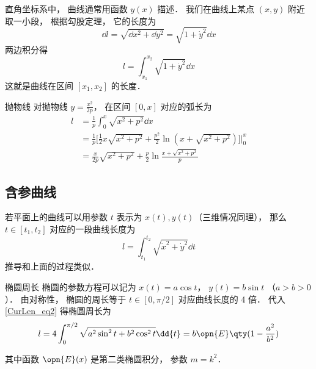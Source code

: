 

直角坐标系中， 曲线通常用函数 $y(x)$ 描述． 我们在曲线上某点 $(x, y)$ 附近取一小段， 根据勾股定理， 它的长度为
\begin{equation}
\dd{l} = \sqrt{\dd{x}^2 + \dd{y}^2} = \sqrt{1 + \dot y^2} \dd{x}
\end{equation}
两边积分得
\begin{equation}\label{CurLen_eq1}
l = \int_{x_1}^{x_2} \sqrt{1 + \dot y^2} \dd{x}
\end{equation}
这就是曲线在区间 $[x_1, x_2]$ 的长度．

\begin{example}{抛物线}
对抛物线 $y=\frac{x^2}{2p}$， 在区间 $[0,x]$ 对应的弧长为
\begin{equation}
\begin{aligned}
l& = \frac{1}{p}\int_{0}^{x}\sqrt{x^2+p^2}\dd{x}\\
&=\frac{1}{p}\bigg[\frac{1}{2}x\sqrt{x^2+p^2}+\frac{p^2}{2}\ln(x+\sqrt{x^2+p^2})\bigg]\Bigg\lvert_{0}^{x}\\
&=\frac{x}{2p}\sqrt{x^2+p^2}+\frac{p}{2}\ln\frac{x+\sqrt{x^2+p^2}}{p}
\end{aligned}
\end{equation}
\end{example}

\subsection{含参曲线}
若平面上的曲线可以用参数 $t$ 表示为 $x(t), y(t)$（三维情况同理）， 那么 $t \in [t_1, t_2]$ 对应的一段曲线长度为
\begin{equation}\label{CurLen_eq2}
l = \int_{t_1}^{t_2} \sqrt{\dot x^2 + \dot y^2} \dd{t}
\end{equation}
推导和上面的过程类似．

\begin{example}{椭圆周长}
椭圆的参数方程可以记为 $x(t) = a\cos t$， $y(t) = b\sin t$ （$a > b > 0$）． 由对称性， 椭圆的周长等于 $t \in [0, \pi/2]$ 对应曲线长度的 4 倍． 代入\autoref{CurLen_eq2} 得椭圆周长为
\begin{equation}
l = 4\int_0^{\pi/2} \sqrt{a^2\sin^2 t + b^2 \cos^2 t} \dd{t} = b \opn{E}\qty(1 - \frac{a^2}{b^2})
\end{equation}
\end{example}
其中函数 $\opn{E}(x)$ 是第二类椭圆积分， 参数 $m=k^2$．
